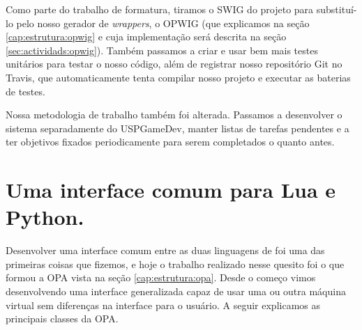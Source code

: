 
  Como parte do trabalho de formatura, tiramos o SWIG do projeto para substituí-lo
  pelo nosso gerador de \textit{wrappers}, o OPWIG (que explicamos na seção 
  \ref{cap:estrutura:opwig} e cuja implementação será descrita na seção 
  \ref{sec:actividads:opwig}). Também passamos a criar e usar bem mais testes
  unitários para testar o nosso código, além de registrar nosso repositório Git
  no Travis\footnotemark, que automaticamente tenta compilar nosso projeto e
  executar as baterias de testes.
  
  
  Nossa metodologia de trabalho também foi alterada. Passamos a desenvolver o
  sistema separadamente do USPGameDev, manter listas de tarefas pendentes e a
  ter objetivos fixados periodicamente para serem completados o quanto antes.
  
  \section{Uma interface comum para Lua e Python.}
  \label{sec:atividades:opa}
  Desenvolver uma interface comum entre as duas linguagens de \script{} foi uma das 
  primeiras coisas que fizemos, e hoje o trabalho realizado nesse quesito foi o que
  formou a OPA vista na seção \ref{cap:estrutura:opa}. Desde o começo vimos
  desenvolvendo uma interface generalizada capaz de usar uma ou outra máquina
  virtual sem diferenças na interface para o usuário. A seguir
  explicamos as principais classes da OPA.
  
